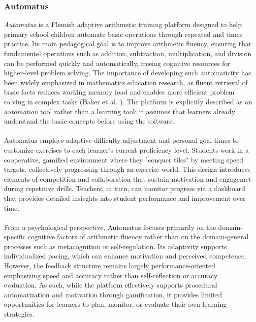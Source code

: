 \subsubsection{Automatus}
\textit{Automatus} is a Flemish adaptive arithmetic training platform designed to help primary school children automate basic operations through repeated and times practice. Its main pedagogical goal is to improve arithmetic fluency, ensuring that fundamentel operations such as addition, subtraction, multiplication, and division can be performed quickly and automatically, freeing cognitive resources for higher-level problem solving. The importance of developing such automaticity has been widely emphasized in mathematics education research, as fluent retrieval of basic facts reduces working memory load and enables more efficient problem solving in complex tasks (Baker et al. \cite{baker_importance_2018}). The platform is explicitly described as an \textit{automation} tool rather than a learning tool: it assumes that learners already understand the basic concepts before using the software.\\ \\
Automatus employs adaptive difficulty adjustment and personal goal times to customize exercises to each learner's current proficiency level. Students work in a cooperative, gamified environment where they "conquer tiles" by meeting speed targets, collectively progressing through an exercise world. This design introduces elements of competition and collaboration that sustain motivation and engagemet during repetitive drills. Teachers, in turn, can monitor progress via a dashboard that provides detailed insisghts into student performance and improvement over time.\\ \\
From a psychological perspective, Automatus focuses primarily on the domain-specific cognitive factors of arithmetic fluency rather than on the domain-general processes such as metacognition or self-regulation. Its adaptivity supports individualized pacing, which can enhance motivation and perceived competence. However, the feedback structure remains largely performance-oriented emphasizing speed and accuracy rather than self-reflection or accuracy evaluation. As such, while the platform effectively supports procedural automatization and motivation through gamification, it provides limited opportunities for learners to plan, monitor, or evaluate their own learning strategies.
